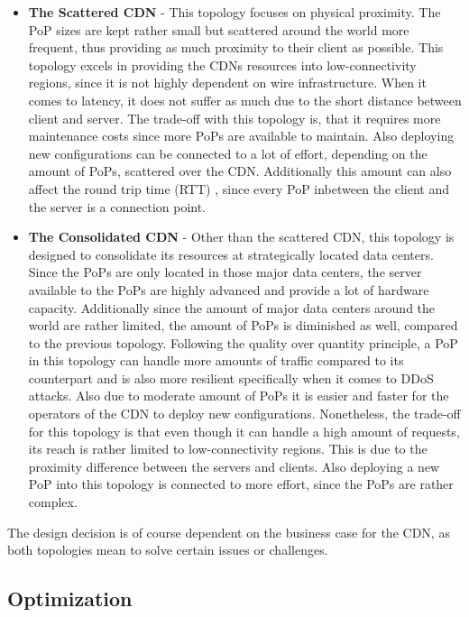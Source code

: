 \begin{itemize}
	\item \textbf{The Scattered CDN} - This topology focuses on physical proximity. The PoP sizes are kept rather small but scattered around the world more frequent, thus providing as much proximity to their client as possible. This topology excels in providing the CDNs resources into low-connectivity regions, since it is not highly dependent on wire infrastructure. When it comes to latency, it does not suffer as much due to the short distance between client and server. The trade-off with this topology is, that it requires more maintenance costs since more PoPs are available to maintain. Also deploying new configurations can be connected to a lot of effort, depending on the amount of PoPs, scattered over the CDN. 
	Additionally this amount can also affect the round trip time (RTT) , since every PoP inbetween the client and the server is a connection point.
	
	\item \textbf{The Consolidated CDN} - Other than the scattered CDN, this topology is designed to consolidate its resources at strategically located data centers. Since the PoPs are only located in those major data centers, the server available to the PoPs are highly advanced and provide a lot of hardware capacity. Additionally since the amount of major data centers around the world are rather limited, the amount of PoPs is diminished as well, compared to the previous topology. Following the quality over quantity principle, a PoP in this topology can handle more amounts of traffic compared to its counterpart and is also more resilient specifically when it comes to DDoS attacks. Also due to moderate amount of PoPs it is easier and faster for the operators of the CDN to deploy new configurations.
	Nonetheless, the trade-off for this topology is that even though it can handle a high amount of requests, its reach is rather limited to low-connectivity regions. This is due to the proximity difference between the servers and clients. Also deploying a new PoP into this topology is connected to more effort, since the PoPs are rather complex.	
\end{itemize}

The design decision is of course dependent on the business case for the CDN, as both topologies mean to solve certain issues or challenges. \cite{cdn_architecture} 

\subsection{Optimization}

